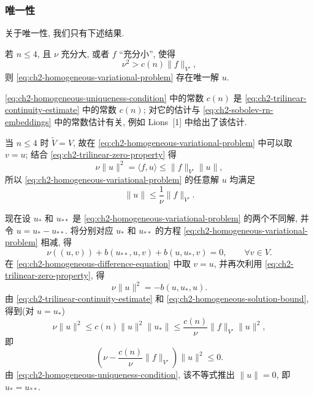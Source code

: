 \subsubsection*{唯一性}

关于唯一性, 我们只有下述结果.

\hypertarget{chapter-02-page-127}{}
\begin{Theorem}
\label{thm:ch2-homogeneous-uniqueness}
若 $n\leq4$, 且 $\nu$ 充分大, 或者 $f$ ``充分小'', 使得
\begin{equation}
\nu^2>c(n)\lVert f\rVert_{V'},
\label{eq:ch2-homogeneous-uniqueness-condition}
\end{equation}
则 \eqref{eq:ch2-homogeneous-variational-problem} 存在唯一解 $u$.
\end{Theorem}

\eqref{eq:ch2-homogeneous-uniqueness-condition} 中的常数 $c(n)$ 是 \eqref{eq:ch2-trilinear-continuity-estimate} 中的常数 $c(n)$; 对它的估计与 \eqref{eq:ch2-sobolev-rn-embeddings} 中的常数估计有关, 例如 Lions~[1] 中给出了该估计.

\begin{Proof}
当 $n\leq4$ 时 $\widetilde V=V$, 故在 \eqref{eq:ch2-homogeneous-variational-problem} 中可以取 $v=u$; 结合 \eqref{eq:ch2-trilinear-zero-property} 得
\begin{equation}
\nu\lVert u\rVert^2=\langle f,u\rangle
\leq\lVert f\rVert_{V'}\lVert u\rVert,
\label{eq:ch2-homogeneous-energy-identity}
\end{equation}
所以 \eqref{eq:ch2-homogeneous-variational-problem} 的任意解 $u$ 均满足
\begin{equation}
\lVert u\rVert\leq\frac1\nu\lVert f\rVert_{V'}.
\label{eq:ch2-homogeneous-solution-bound}
\end{equation}

现在设 $u_*$ 和 $u_{**}$ 是 \eqref{eq:ch2-homogeneous-variational-problem} 的两个不同解, 并令 $u=u_*-u_{**}$. 将分别对应 $u_*$ 和 $u_{**}$ 的方程 \eqref{eq:ch2-homogeneous-variational-problem} 相减, 得
\begin{equation}
\nu((u,v))+b(u_{**},u,v)+b(u,u_*,v)=0,
\qquad\forall v\in V.
\label{eq:ch2-homogeneous-difference-equation}
\end{equation}
在 \eqref{eq:ch2-homogeneous-difference-equation} 中取 $v=u$, 并再次利用 \eqref{eq:ch2-trilinear-zero-property}, 得
\[
\nu\lVert u\rVert^2=-b(u,u_*,u).
\]
由 \eqref{eq:ch2-trilinear-continuity-estimate} 和 \eqref{eq:ch2-homogeneous-solution-bound}, 得到(对 $u=u_*$)
\[
\nu\lVert u\rVert^2
\leq c(n)\lVert u\rVert^2\lVert u_*\rVert
\leq\frac{c(n)}\nu\lVert f\rVert_{V'}\lVert u\rVert^2,
\]
即
\[
\left(\nu-\frac{c(n)}\nu\lVert f\rVert_{V'}\right)\lVert u\rVert^2\leq0.
\]
由 \eqref{eq:ch2-homogeneous-uniqueness-condition}, 该不等式推出 $\lVert u\rVert=0$, 即 $u_*=u_{**}$.
\end{Proof}

